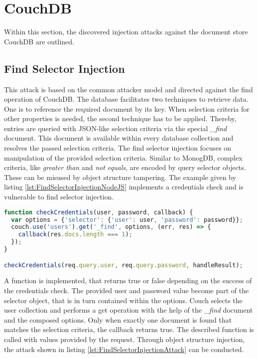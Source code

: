 \section{CouchDB}
Within this section, the discovered injection attacks against the document store CouchDB are outlined.

\subsection{Find Selector Injection}
This attack is based on the common attacker model and directed against the find operation of CouchDB. The database facilitates two techniques to retrieve data. One is to reference the required document by its key. When selection criteria for other properties is needed, the second technique has to be applied. Thereby, entries are queried with JSON-like selection criteria via the special \emph{\_find} document. This document is available within every database collection and resolves the passed selection criteria. The find selector injection focuses on manipulation of the provided selection criteria. Similar to MonogDB, complex criteria, like \emph{greater than} and \emph{not equals}, are encoded by query selector objects. These can be misused by object structure tampering. The example given by listing \ref{lst:FindSelectorInjectionNodeJS} implements a credentials check and is vulnerable to find selector injection. \\

\begin{lstlisting}[caption={Vulnerable NodeJS example for find selector injection against CouchDB}, label={lst:FindSelectorInjectionNodeJS}, language=JavaScript]
function checkCredentials(user, password, callback) {
  var options = {'selector': {'user': user, 'password': password}};
  couch.use('users').get('_find', options, (err, res) => {
    callback(res.docs.length === 1);
  });
}

checkCredentials(req.query.user, req.query.password, handleResult);
\end{lstlisting}

A function is implemented, that returns true or false depending on the success of the credentials check. The provided user and password value become part of the selector object, that is in turn contained within the options. Couch selects the user collection and performs a get operation with the help of the \emph{\_find} document and the composed options. Only when exactly one document is found that matches the selection criteria, the callback returns true. The described function is called with values provided by the request. Through object structure injection, the attack shown in listing \ref{lst:FindSelectorInjectionAttack} can be conducted. \\

